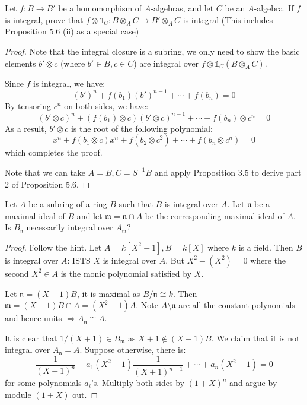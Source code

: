 \documentclass{solution}
\begin{document}
\begin{problem}
    Let $f: B \rightarrow B'$ be a homomorphism of $A$-algebras, and let $C$ be an $A$-algebra. If $f$ is integral, prove that $f \otimes \mathds{1}_C: B \otimes_A C \rightarrow B' \otimes_A C$ is integral (This includes Proposition 5.6 (ii) as a special case)
\end{problem}

\begin{proof}
    Note that the integral closure is a subring, we only need to show the basic elements $b' \otimes c$ (where $b' \in B, c \in C$) are integral over $f \otimes \mathds{1}_C(B \otimes_A C)$.

    Since $f$ is integral, we have:
    $$(b')^n + f(b_1)(b')^{n - 1} + \cdots + f(b_n) = 0$$
    By tensoring $c^n$ on both sides, we have:
    $$(b' \otimes c)^n + (f(b_1) \otimes c)(b' \otimes c)^{n - 1} + \cdots + f(b_n) \otimes c^{n} = 0$$
    As a result, $b' \otimes c$ is the root of the following polynomial:
    $$x^n + f(b_1 \otimes c)x^n + f(b_2 \otimes c^2) + \cdots + f(b_n \otimes c^n) = 0$$
    which completes the proof.

    Note that we can take $A = B, C = S ^{-1} B$ and apply Proposition 3.5 to derive part 2 of Proposition 5.6.
\end{proof}

\begin{problem}
    Let $A$ be a subring of a ring $B$ such that $B$ is integral over $A$. Let $\mathfrak{n}$ be a maximal ideal of $B$ and let $\mathfrak{m} = \mathfrak{n} \cap A$ be the corresponding maximal ideal of $A$. Is $B_{\mathfrak{n}}$ necessarily integral over $A_{\mathfrak{m}}$?
\end{problem}

\begin{proof}
    Follow the hint. Let $A = k[X^2 - 1], B = k[X]$ where $k$ is a field. Then $B$ is integral over $A$: ISTS $X$ is integral over $A$. But $X^2 - (X^2) = 0$ where the second $X^2 \in A$ is the monic polynomial satisfied by $X$.
    
    Let $\mathfrak{n} = (X - 1)B$, it is maximal as $B / \mathfrak{n} \cong k$. Then $\mathfrak{m} = (X - 1)B \cap A = (X^2 - 1)A$. Note $A \setminus \mathfrak{n}$ are all the constant polynomials and hence units $\Rightarrow A_{\mathfrak{n}} \cong A$.
    
    It is clear that $1 / (X + 1) \in B_{\mathfrak{m}}$ as $X + 1 \notin (X - 1)B$. We claim that it is not integral over $A_{\mathfrak{n}} = A$. Suppose otherwise, there is:
    $$\frac{1}{(X + 1)^n} + a_1(X^2 - 1) \frac{1}{(X + 1)^{n - 1}} + \cdots + a_n(X^2 - 1) = 0$$
    for some polynomials $a_i$'s. Multiply both sides by $(1 + X)^n$ and argue by module $(1 + X)$ out.
\end{proof}
\end{document}
